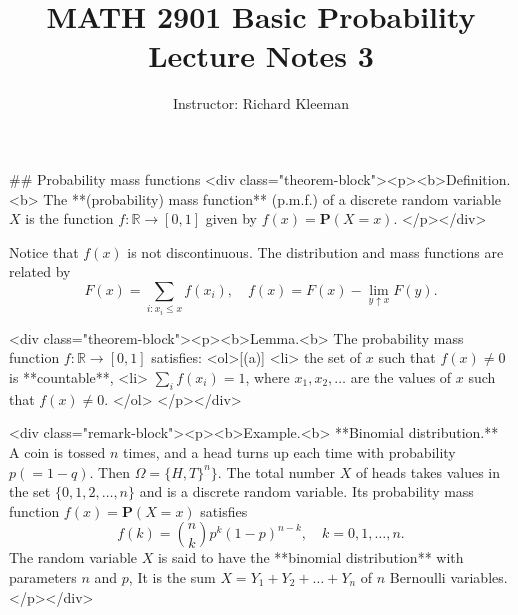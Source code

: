 


\title{MATH 2901 Basic Probability Lecture Notes 3}
\author{Instructor: Richard Kleeman}
\date{}
\maketitle


## Probability mass functions
<div class="theorem-block"><p><b>Definition.<b> 
The **(probability) mass function** (p.m.f.) of a discrete random variable $X$ is the function $f: \mathbb{R} \to[0, 1]$ given by $f(x) = \mathbf{P}(X = x)$. 
</p></div>

Notice that $f(x)$ is not discontinuous. The distribution and mass functions are related by
$$\begin{equation}
    F(x) = \sum_{i: x_i \leq x} f(x_i), \quad f(x) = F(x) - \lim_{y\uparrow x} F(y).
\end{equation}$$

<div class="theorem-block"><p><b>Lemma.<b> 
The probability mass function $f: \mathbb{R} \to [0, 1]$ satisfies: 
<ol>[(a)]
    <li> the set of $x$ such that $f(x) \neq 0$ is **countable**,
    <li> $\sum_{i} f(x_i) = 1$, where $x_1, x_2, \dots$ are the values of $x$ such that $f(x)\neq 0$.
</ol>
</p></div>

<div class="remark-block"><p><b>Example.<b> 
**Binomial distribution.** A coin is tossed $n$ times, and a head turns up each time with probability $p (= 1 - q)$. Then $\Omega = \{H, T\}^n \}$. The total number $X$ of heads takes values in the set $\{0, 1, 2, \dots , n\}$ and is a discrete random variable. Its probability mass function $f(x) = \mathbf{P}(X = x)$ satisfies 
$$\begin{equation}
    f(k)= \binom{n}{k} p^{k}(1-p)^{n-k}, \quad k=0,1, \ldots, n.
\end{equation}$$
The random variable $X$ is said to have the **binomial distribution** with parameters $n$ and $p$, It is the sum $X = Y_1 + Y_2 + \dots + Y_n$ of $n$ Bernoulli variables.
</p></div>

